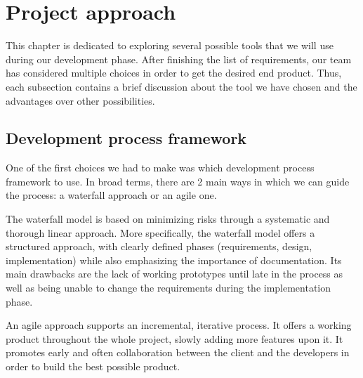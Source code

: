 \documentclass{report}
\begin{document}



































\chapter{Project approach}
This chapter is dedicated to exploring several possible tools that we will use during our development phase. After finishing the list of requirements, our team has considered multiple choices in order to get the desired end product. Thus, each subsection contains a brief discussion about the tool we have chosen and the advantages over other possibilities.


\section{Development process framework}
One of the first choices we had to make was which development process framework to use. In broad terms, there are 2 main ways in which we can guide the process: a waterfall approach or an agile one.

The waterfall model \cite{royce1987managing} is based on minimizing risks through a systematic and thorough linear approach. More specifically, the waterfall model offers a structured approach, with clearly defined phases (requirements, design, implementation) while also emphasizing the importance of documentation. Its main drawbacks are the lack of working prototypes until late in the process as well as being unable to change the requirements during the implementation phase.

An agile approach \cite{fowler2001agile} supports an incremental, iterative process. It offers a working product throughout the whole project, slowly adding more features upon it. It promotes early and often collaboration between the client and the developers in order to build the best possible product. 
\end{document}
